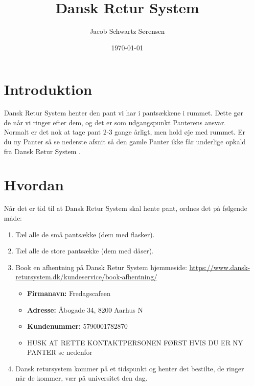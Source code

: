 

\title{Dansk Retur System}
\date{\today}
\author{Jacob Schwartz Sørensen}



\maketitle

\newcommand{\DRS}{Dansk Retur System }

\section{Introduktion}
\label{sec:Introduktion}

\DRS henter den pant vi har i pantsækkene i rummet. Dette gør de når vi ringer efter dem, og det er som udgangspunkt Panterens ansvar.
Normalt er det nok at tage pant 2-3 gange årligt, men hold øje med rummet.
Er du ny Panter så se nederste afsnit så den gamle Panter ikke får underlige opkald fra \DRS.

\section{Hvordan}
\label{sec:Hvordan}

Når det er tid til at \DRS skal hente pant, ordnes det på følgende måde:

\begin{enumerate}
	\item Tæl alle de små pantsække (dem med flasker).
	\item Tæl alle de store pantsække (dem med dåser).
	\item Book en afhentning på \DRS hjemmeside: \url{https://www.dansk-retursystem.dk/kundeservice/book-afhentning/}
	\begin{itemize}
		\item \textbf{Firmanavn:} Fredagscafeen
		\item \textbf{Adresse:} Åbogade 34, 8200 Aarhus N
		\item \textbf{Kundenummer:} 5790001782870
		\item HUSK AT RETTE KONTAKTPERSONEN FØRST HVIS DU ER NY PANTER se nedenfor
	\end{itemize}
	\item Dansk retursystem kommer på et tidspunkt og henter det bestilte, de ringer når de kommer, vær på universitet den dag.
\end{enumerate}

